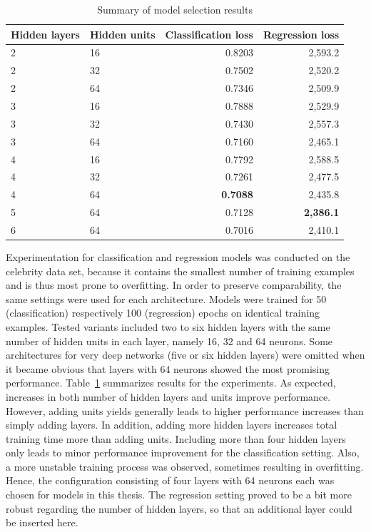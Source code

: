 \begin{table}
\begin{tabular}{llrr}
\toprule
Hidden layers & Hidden units & Classification loss & Regression loss \\
\midrule
2 & 16 & 0.8203 & 2,593.2 \\
2 & 32 & 0.7502 & 2,520.2 \\
2 & 64 & 0.7346 & 2,509.9 \\
3 & 16 & 0.7888 & 2,529.9 \\
3 & 32 & 0.7430 & 2,557.3 \\
3 & 64 & 0.7160 & 2,465.1 \\
4 & 16 & 0.7792 & 2,588.5 \\
4 & 32 & 0.7261 & 2,477.5 \\
4 & 64 & \textbf{0.7088} & 2,435.8 \\
5 & 64 & 0.7128 & \textbf{2,386.1} \\
6 & 64 & 0.7016 & 2,410.1 \\
\bottomrule
\end{tabular}
\caption{Summary of model selection results}
\label{tab:dm1_selection_results}
\end{table}

Experimentation for classification and regression models was conducted on the
celebrity data set, because it contains the smallest number of training examples
and is thus most prone to overfitting.
In order to preserve comparability, the same settings were used for each architecture.
Models were trained for 50 (classification) respectively 100 (regression) epochs
on identical training examples.
Tested variants included two to six hidden layers with the same number of hidden
units in each layer, namely 16, 32 and 64 neurons.
Some architectures for very deep networks (five or six hidden layers) were omitted
when it became obvious that layers with 64 neurons showed the most promising
performance.
Table~\ref{tab:dm1_selection_results} summarizes results for the experiments.
As expected, increases in both number of hidden layers and units improve
performance.
However, adding units yields generally leads to higher performance increases than
simply adding layers.
In addition, adding more hidden layers increases total training time more than
adding units.
Including more than four hidden layers only leads to minor performance improvement for
the classification setting.
Also, a more unstable training process was observed, sometimes resulting in overfitting.
Hence, the configuration consisting of four layers with 64 neurons each was
chosen for models in this thesis.
The regression setting proved to be a bit more robust regarding the number of
hidden layers, so that an additional layer could be inserted here.


